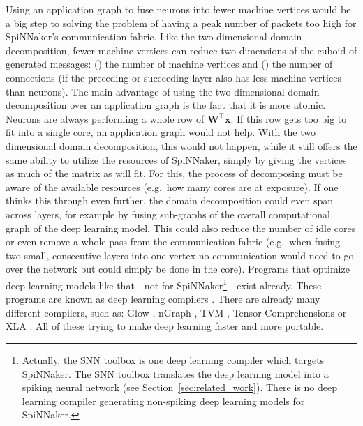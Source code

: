 \documentclass[]{article}
\begin{document}
Using an application graph to fuse neurons into fewer machine vertices
would be a big step to solving the problem of having a peak number of
packets too high for SpiNNaker's communication fabric.
Like the two dimensional domain decomposition, fewer machine vertices
can reduce two dimensions of the cuboid of generated messages:
() the number of machine vertices and ()
the number of connections (if the preceding or succeeding layer also
has less machine vertices than neurons).
The main advantage of using the two dimensional domain decomposition
over an application graph is the fact that it is more atomic.
Neurons are always performing a whole row of
$\mathbf{W}^\top\mathbf{x}$.
If this row gets too big to fit into a single core, an application
graph would not help.
With the two dimensional domain decomposition, this would not happen,
while it still offers the same ability to utilize the resources of
SpiNNaker, simply by giving the vertices as much of the matrix as will
fit.
For this, the process of decomposing must be aware of the available
resources (e.g.\ how many cores are at exposure).
If one thinks this through even further, the domain decomposition
could even span across layers, for example by fusing sub-graphs of the
overall computational graph of the deep learning model.
This could also reduce the number of idle cores or even remove
a whole pass from the communication fabric (e.g.\ when fusing two
small, consecutive layers into one vertex no communication would need
to go over the network but could simply be done in the core).
Programs that optimize deep learning models like that---not for
SpiNNaker\footnote{Actually, the SNN toolbox is one deep learning
  compiler which targets SpiNNaker.
  The SNN toolbox translates the deep learning model into a spiking
  neural network (see Section~\ref{sec:related_work}).
  There is no deep learning compiler generating non-spiking deep
  learning models for SpiNNaker.}---exist already.
These programs are known as deep learning compilers
\citep{li_et_al_2020}.
There are already many different compilers, such as:
Glow \citep{rotem_et_al_2018}, nGraph \citep{cyphers_et_al_2018},
TVM \citep{chen_et_al_2018}, Tensor Comprehensions
\citep{vasilache_et_al_2018} or XLA \citep{leary_et_al_2017}.
All of these trying to make deep learning faster and more portable.
\end{document}
